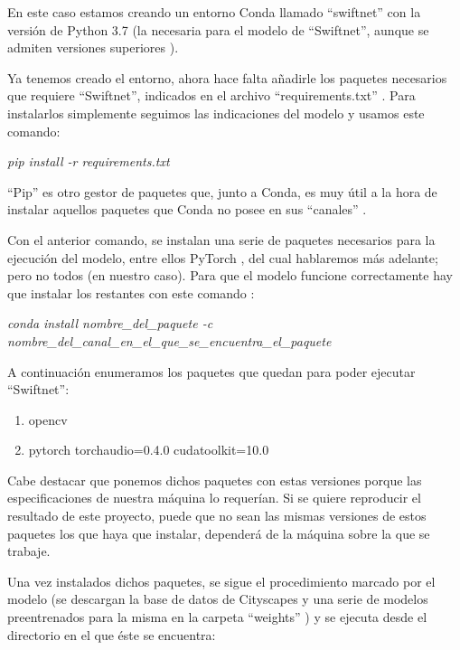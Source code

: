 En este caso estamos creando un entorno Conda llamado ``swiftnet'' con la versión de Python 3.7 (la necesaria para el modelo de ``Swiftnet'', aunque se admiten versiones superiores  \cite{github_swiftnet}).


Ya tenemos creado el entorno, ahora hace falta añadirle los paquetes necesarios que requiere ``Swiftnet'', indicados en el archivo ``requirements.txt'' \cite{github_swiftnet}. Para instalarlos simplemente seguimos las indicaciones del modelo y usamos este comando:

\begin{center}
\textit{pip install -r requirements.txt}
\end{center}

``Pip'' es otro gestor de paquetes que, junto a Conda, es muy útil a la hora de instalar aquellos paquetes que Conda no posee en sus ``canales'' \cite{pip}.

Con el anterior comando, se instalan una serie de paquetes necesarios para la ejecución del modelo, entre ellos PyTorch \cite{pytorch}, del cual hablaremos más adelante; pero no todos (en nuestro caso). Para que el modelo funcione correctamente hay que instalar los restantes con este comando \cite{conda_sheet}:

\begin{center}
\textit{conda install nombre\_del\_paquete -c nombre\_del\_canal\_en\_el\_que\_se\_encuentra\_el\_paquete}
\end{center}

A continuación enumeramos los paquetes que quedan para poder ejecutar ``Swiftnet'':

\begin{enumerate}
\item opencv \cite{opencv}
\item pytorch torchaudio=0.4.0 cudatoolkit=10.0 \cite{pytorch}
\end{enumerate}

Cabe destacar que ponemos dichos paquetes con estas versiones porque las especificaciones de nuestra máquina lo requerían. Si se quiere reproducir el resultado de este proyecto, puede que no sean las mismas versiones de estos paquetes los que haya que instalar, dependerá de la máquina sobre la que se trabaje.

Una vez instalados dichos paquetes, se sigue el procedimiento marcado por el modelo (se descargan la base de datos de Cityscapes \cite{cityscapes} y una serie de modelos preentrenados para la misma en la carpeta ``weights'' \cite{github_swiftnet}) y se ejecuta desde el directorio en el que éste se encuentra:

